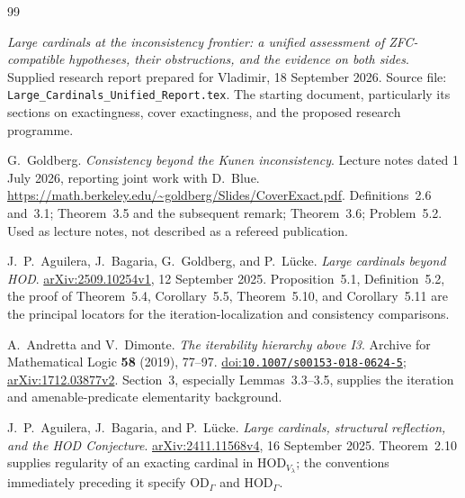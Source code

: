 \documentclass[11pt,letterpaper]{article}
\theoremstyle{definition}
\newcommand{\HOD}{\mathrm{HOD}}
\newcommand{\OD}{\mathrm{OD}}
\newcommand{\arxiv}[1]{\href{https://arxiv.org/abs/#1}{arXiv:#1}}
\newcommand{\doi}[1]{\href{https://doi.org/#1}{doi:\nolinkurl{#1}}}
\begin{document}
\clearpage
{}
{}
\begin{thebibliography}{99}
\small
\setlength{\itemsep}{7pt}
\setlength{\parskip}{1pt}

\emph{Large cardinals at the inconsistency frontier: a unified assessment
of ZFC-compatible hypotheses, their obstructions, and the evidence on
both sides}. Supplied research report prepared for Vladimir,
18 September 2026. Source file:
\nolinkurl{Large_Cardinals_Unified_Report.tex}.
The starting document, particularly its sections on exactingness,
cover exactingness, and the proposed research programme.

G.~Goldberg. \emph{Consistency beyond the Kunen inconsistency}.
Lecture notes dated 1 July 2026, reporting joint work with D.~Blue.
\url{https://math.berkeley.edu/~goldberg/Slides/CoverExact.pdf}.
Definitions~2.6 and~3.1; Theorem~3.5 and the subsequent remark;
Theorem~3.6; Problem~5.2. Used as lecture notes, not described as a
refereed publication.

J.~P.~Aguilera, J.~Bagaria, G.~Goldberg, and P.~L\"ucke.
\emph{Large cardinals beyond HOD}.
\arxiv{2509.10254v1}, 12 September 2025.
Proposition~5.1, Definition~5.2, the proof of Theorem~5.4,
Corollary~5.5, Theorem~5.10, and Corollary~5.11 are the principal
locators for the iteration-localization and consistency comparisons.

A.~Andretta and V.~Dimonte. \emph{The iterability hierarchy above I3}.
Archive for Mathematical Logic \textbf{58} (2019), 77--97.
\doi{10.1007/s00153-018-0624-5}; \arxiv{1712.03877v2}.
Section~3, especially Lemmas~3.3--3.5, supplies the iteration and
amenable-predicate elementarity background.

J.~P.~Aguilera, J.~Bagaria, and P.~L\"ucke.
\emph{Large cardinals, structural reflection, and the HOD Conjecture}.
\arxiv{2411.11568v4}, 16 September 2025.
Theorem~2.10 supplies regularity of an exacting cardinal in
$\HOD_{V_\lambda}$; the conventions immediately preceding it specify
$\OD_\Gamma$ and $\HOD_\Gamma$.

\end{thebibliography}
\end{document}
